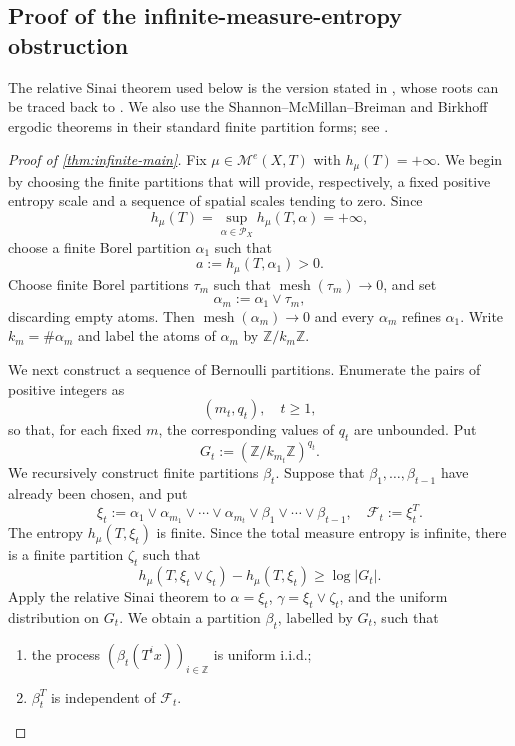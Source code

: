 \documentclass[10pt,a4paper]{amsart}
\newcommand{\Z}{\mathbb Z}
\newcommand{\cF}{\mathcal F}
\newcommand{\cP}{\mathcal P}
\newcommand{\mesh}{\operatorname{mesh}}
\numberwithin{equation}{section}
\begin{document}
	\subsection{Proof of the infinite-measure-entropy obstruction}
	\label{sec:infinite-proof}
	
    The relative Sinai theorem used below is the version stated in \cite[Lemma~4.2]{HYZ2014}, whose roots can be traced back to \cite{OrnsteinWeiss1975,Thouvenot1975,Kieffer1984}. We also use the
	Shannon--McMillan--Breiman and Birkhoff ergodic theorems in their standard finite
	partition forms; see \cite{Walters1982}.
	

	\begin{proof}[Proof of \cref{thm:infinite-main}]
		Fix $\mu\in \mathcal{M}^e(X,T)$ with $h_\mu(T)=+\infty$.  We begin by
		choosing the finite partitions that will provide, respectively, a fixed
		positive entropy scale and a sequence of spatial scales tending to zero.
		Since
		\[
		h_\mu(T)=\sup_{\alpha\in\cP_X}h_\mu(T,\alpha)=+\infty,
		\]
		choose a finite Borel partition $\alpha_1$ such that
		\[
		a:=h_\mu(T,\alpha_1)>0.
		\]
		Choose finite Borel partitions $\tau_m$ such that
		$\mesh(\tau_m)\to0$, and set
		\[
		\alpha_m:=\alpha_1\vee\tau_m,
		\]
		discarding empty atoms. Then $\mesh(\alpha_m)\to0$ and every $\alpha_m$
		refines $\alpha_1$. Write
		$k_m=\#\alpha_m$ and label the atoms of $\alpha_m$ by
		$\Z/k_m\Z$.
		
		
		We next construct a sequence of Bernoulli partitions.  Enumerate
		the pairs of positive integers as
		\[
		(m_t,q_t),\quad t\geq1,
		\]
		so that, for each fixed $m$, the corresponding values of $q_t$ are
		unbounded. Put
		\[
		G_t:=(\Z/k_{m_t}\Z)^{q_t}.
		\]
		We recursively construct finite partitions $\beta_t$. Suppose that
		$\beta_1,\ldots,\beta_{t-1}$ have already been chosen, and put
		\[
		\xi_t
		:=
		\alpha_1\vee
		\alpha_{m_1}\vee\cdots\vee\alpha_{m_t}\vee
		\beta_1\vee\cdots\vee\beta_{t-1},
		\quad
		\cF_t:=\xi_t^T.
		\]
		The entropy $h_\mu(T,\xi_t)$ is finite. Since the total measure entropy is
		infinite, there is a finite partition $\zeta_t$ such that
		\[
		h_\mu(T,\xi_t\vee\zeta_t)-h_\mu(T,\xi_t)
		\geq\log|G_t|.
		\]
		Apply the relative Sinai theorem to
		$\alpha=\xi_t$, $\gamma=\xi_t\vee\zeta_t$, and the uniform distribution on
		$G_t$. We obtain a partition $\beta_t$, labelled by $G_t$, such that
		\begin{enumerate}
			\item the process $(\beta_t(T^ix))_{i\in\Z}$ is uniform i.i.d.;
			\item $\beta_t^T$ is independent of $\cF_t$.
		\end{enumerate}
		

\end{proof}
\end{document}
